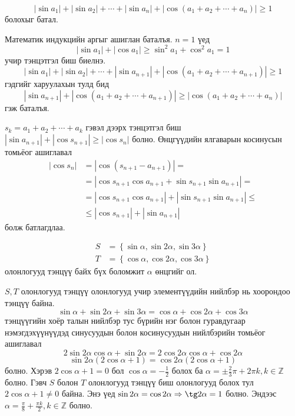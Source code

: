 \documentclass[10pt,a4paper,oneside]{book}
\begin{document}
\Problem
\begin{equation*}
|\sin a_1| + |\sin a_2| + \cdots + |\sin a_n| + |\cos (a_1 + a_2 + \cdots + a_n)| \geq 1
\end{equation*}
болохыг батал.

\TheSolution
Математик индукцийн аргыг ашиглан баталъя. $n = 1$ үед
\begin{equation*}
|\sin a_1| + |\cos a_1| \geq \sin^2 a_1 + \cos^2 a_1 = 1
\end{equation*}
учир тэнцэтгэл биш биелнэ.
\begin{equation*}
|\sin a_1| + |\sin a_2| + \cdots + |\sin a_{n+1}| + |\cos (a_1 + a_2 + \cdots + a_{n+1})| \geq 1
\end{equation*}
гэдгийг харуулахын тулд бид
\begin{equation*}
|\sin a_{n+1}| + |\cos (a_1 + a_2 + \cdots + a_{n+1})| \geq |\cos(a_1 + a_2 + \cdots + a_n)|
\end{equation*}
гэж баталъя.

$s_k = a_1 + a_2 + \cdots + a_k$ гэвэл дээрх тэнцэтгэл биш $|\sin a_{n+1}| + |\cos s_{n+1}| \geq |\cos s_n|$ болно. Өнцгүүдийн ялгаварын косинусын томьёог ашиглавал
\begin{align*}
|\cos s_n| &= |\cos(s_{n+1} - a_{n+1})| = \\
&= |\cos s_{n+1}\cos a_{n+1} + \sin s_{n+1}\sin a_{n+1}| = \\
&= |\cos s_{n+1}\cos a_{n+1}| + |\sin s_{n+1}\sin a_{n+1}| \leq \\
&\leq |\cos s_{n+1}| + |\sin a_{n+1}|
\end{align*}
болж батлагдлаа.

\begin{align*}
S &= \left\lbrace \sin \alpha, \sin 2\alpha, \sin 3\alpha \right\rbrace \\
T &= \left\lbrace \cos \alpha, \cos 2\alpha, \cos 3\alpha \right\rbrace
\end{align*}
олонлогууд тэнцүү байх бүх боломжит $\alpha$ өнцгийг ол.

\TheSolution
$S, T$  олонлогууд тэнцүү олонлогууд учир элементүүдийн нийлбэр нь хоорондоо тэнцүү байна.
\begin{equation*}
\sin \alpha + \sin 2\alpha + \sin 3\alpha = \cos \alpha + \cos 2\alpha + \cos 3\alpha
\end{equation*}
тэнцүүгийн хоёр талын нийлбэр тус бүрийн нэг болон гуравдугаар нэмэгдэхүүнүүдэд синусуудын болон косинусуудын нийлбэрийн томьёог ашиглавал
\begin{equation*}
2\sin 2\alpha\cos \alpha + \sin 2\alpha = 2\cos 2\alpha \cos \alpha + \cos 2\alpha
\end{equation*}
\begin{equation*}
\sin 2\alpha(2\cos \alpha + 1) = \cos 2\alpha (2\cos \alpha + 1)
\end{equation*}
болно. Хэрэв $2\cos \alpha + 1 = 0$ бол $\cos \alpha  =  -\frac{1}{2}$ болох ба $\alpha = \pm \frac{2}{3}\pi + 2\pi k, k\in \mathbb{Z}$ болно. Гэвч $S$ болон $T$ олонлогууд тэнцүү биш олонлогууд болох тул $2\cos \alpha + 1 \neq 0$ байна. Энэ үед $\sin 2\alpha = \cos 2\alpha \Rightarrow \tg 2\alpha = 1$ болно. Эндээс $\alpha = \frac{\pi}{8} + \frac{\pi k}{2}, k\in \mathbb{Z}$ болно.
\end{document}
